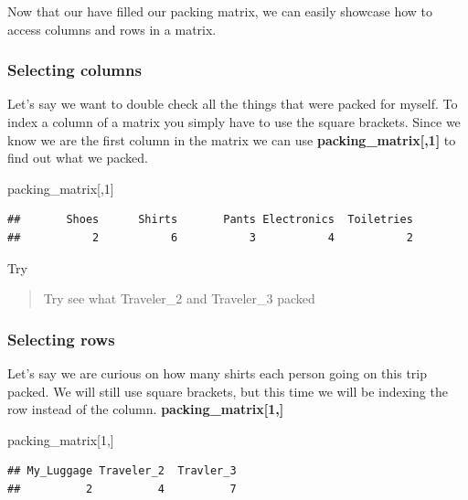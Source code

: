 \documentclass[
]{book}
\newenvironment{Shaded}{\begin{snugshade}}{\end{snugshade}}
\newcommand{\DecValTok}[1]{\textcolor[rgb]{0.00,0.00,0.81}{#1}}
\newcommand{\NormalTok}[1]{#1}
\begin{document}
Now that our have filled our packing matrix, we can easily showcase how to access columns and rows in a matrix.

\hypertarget{selecting-columns}{%
\subsubsection{Selecting columns}\label{selecting-columns}}

Let's say we want to double check all the things that were packed for myself. To index a column of a matrix you simply have to use the square brackets. Since we know we are the first column in the matrix we can use \textbf{packing\_matrix{[},1{]}} to find out what we packed.

\begin{Shaded}
\begin{Highlighting}[]
\NormalTok{packing\_matrix[,}\DecValTok{1}\NormalTok{]}
\end{Highlighting}
\end{Shaded}

\begin{verbatim}
##       Shoes      Shirts       Pants Electronics  Toiletries 
##           2           6           3           4           2
\end{verbatim}

Try

\begin{quote}
Try see what Traveler\_2 and Traveler\_3 packed
\end{quote}

\hypertarget{selecting-rows}{%
\subsubsection{Selecting rows}\label{selecting-rows}}

Let's say we are curious on how many shirts each person going on this trip packed. We will still use square brackets, but this time we will be indexing the row instead of the column. \textbf{packing\_matrix{[}1,{]}}

\begin{Shaded}
\begin{Highlighting}[]
\NormalTok{packing\_matrix[}\DecValTok{1}\NormalTok{,]}
\end{Highlighting}
\end{Shaded}

\begin{verbatim}
## My_Luggage Traveler_2  Travler_3 
##          2          4          7
\end{verbatim}
\end{document}
